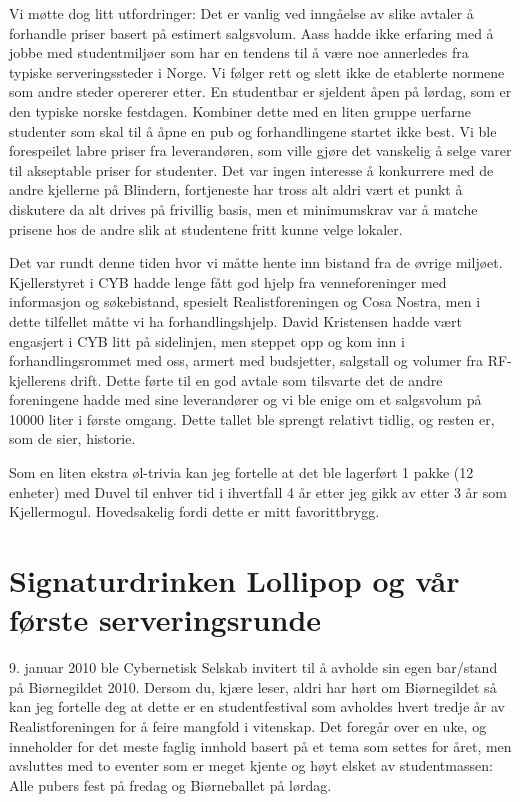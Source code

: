 Vi møtte dog litt utfordringer: Det er vanlig ved inngåelse av slike avtaler å forhandle priser basert på estimert salgsvolum. Aass hadde ikke erfaring med å jobbe med studentmiljøer som har en tendens til å være noe annerledes fra typiske serveringssteder i Norge. Vi følger rett og slett ikke de etablerte normene som andre steder opererer etter. En studentbar er sjeldent åpen på lørdag, som er den typiske norske festdagen. Kombiner dette med en liten gruppe uerfarne studenter som skal til å åpne en pub og forhandlingene startet ikke best. Vi ble forespeilet labre priser fra leverandøren, som ville gjøre det vanskelig å selge varer til akseptable priser for studenter. Det var ingen interesse å konkurrere med de andre kjellerne på Blindern, fortjeneste har tross alt aldri vært et punkt å diskutere da alt drives på frivillig basis, men et minimumskrav var å matche prisene hos de andre slik at studentene fritt kunne velge lokaler.

Det var rundt denne tiden hvor vi måtte hente inn bistand fra de øvrige miljøet. Kjellerstyret i CYB hadde lenge fått god hjelp fra venneforeninger med informasjon og søkebistand, spesielt Realistforeningen og Cosa Nostra, men i dette tilfellet måtte vi ha forhandlingshjelp. David Kristensen hadde vært engasjert i CYB litt på sidelinjen, men steppet opp og kom inn i forhandlingsrommet med oss, armert med budsjetter, salgstall og volumer fra RF-kjellerens drift. Dette førte til en god avtale som tilsvarte det de andre foreningene hadde med sine leverandører og vi ble enige om et salgsvolum på 10000 liter i første omgang. Dette tallet ble sprengt relativt tidlig, og resten er, som de sier, historie.

Som en liten ekstra øl-trivia kan jeg fortelle at det ble lagerført 1 pakke (12 enheter) med Duvel til enhver tid i ihvertfall 4 år etter jeg gikk av etter 3 år som Kjellermogul. Hovedsakelig fordi dette er mitt favorittbrygg.

\section[Signaturdrinker]{Signaturdrinken Lollipop og vår første serveringsrunde}

9. januar 2010 ble Cybernetisk Selskab invitert til å avholde sin egen bar/stand på Biørnegildet 2010. Dersom du, kjære leser, aldri har hørt om Biørnegildet så kan jeg fortelle deg at dette er en studentfestival som avholdes hvert tredje år av Realistforeningen for å feire mangfold i vitenskap. Det foregår over en uke, og inneholder for det meste faglig innhold basert på et tema som settes for året, men avsluttes med to eventer som er meget kjente og høyt elsket av studentmassen: Alle pubers fest på fredag og Biørneballet på lørdag.

